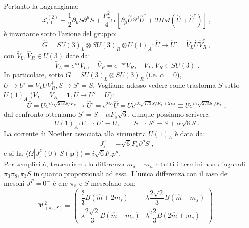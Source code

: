 \documentclass[12pt,a4paper]{article}
\theoremstyle{definition}
\newcommand{\lag}{\mathcal{L}}
\newcommand{\bra}{\langle}
\newcommand{\ket}{\rangle}
\newcommand{\adj}[1]{#1^{\dagger}}
\newcommand{\tr}{\mathrm{tr}}
\numberwithin{equation}{section}
\begin{document}
Pertanto la Lagrangiana:
\begin{equation}
\boxed{
\lag_{\mathrm{eff}}^{(2)}=\frac{1}{2}\partial_{\mu}S\partial^{\mu}S+\frac{F_{\pi}^2}{4}\tr\left[\partial_{\mu}\stackrel{\sim}{U}\partial^{\mu}\adj{\stackrel{\sim}{U}}+2BM(\stackrel{\sim}{U}+\adj{\stackrel{\sim}{U}})\right]
}\;,
\end{equation}
è invariante sotto l'azione del gruppo:
$$
\stackrel{\sim}{G}=SU(3)_L\otimes SU(3)_R\otimes U(1)_A: \stackrel{\sim}{U}\to\stackrel{\sim}{U}'=\stackrel{\sim}{V}_L\stackrel{\sim}{U}\adj{\stackrel{\sim}{V}_R}\;,
$$
con $\stackrel{\sim}{V}_L,\stackrel{\sim}{V}_R\in U(3)$ date da:
\begin{equation}
\stackrel{\sim}{V}_L=e^{i\alpha}V_L,\quad \stackrel{\sim}{V}_R=e^{-i\alpha}V_R,\quad V_L,V_R\in SU(3)\;.
\end{equation}
In particolare, sotto $G=SU(3)_L\otimes SU(3)_R$ (i.e. $\alpha=0$), $U\to U'=V_LU\adj{V}_R, S\to S'=S$. Vogliamo adesso vedere come trasforma $S$ sotto $U(1)_A$ ($V_L=V_R=\mathbf{1}, U\to U'=U$):
$$
\stackrel{\sim}{U}=Ue^{i\lambda\sqrt{2/3}S/F_{\pi}}\to \stackrel{\sim}{U}'=e^{2i\alpha}\stackrel{\sim}{U}=Ue^{i\lambda\sqrt{2/3}S/F_{\pi}+2i\alpha}\equiv Ue^{i\lambda\sqrt{2/3}S'/F_{\pi}}\;,
$$
dal confronto otteniamo $S'=S+\alpha F_s\sqrt{6}$, dunque possiamo scrivere:
\begin{equation}
U(1)_A: U\to U'=U,\qquad S\to S'=S+\alpha\sqrt{6}S\;.
\end{equation}
La corrente di Noether associata alla simmetria $U(1)_A$ è data da:
\begin{equation}
J^{\mu}_5=-\sqrt{6}F_s\partial^{\mu}S\;,
\end{equation}
e si ha $\bra\Omega|J^{\mu}_5(0)|S(\mathbf{p})\ket=i\sqrt{6}F_sp^{\mu}$. \\
Per semplicità, trascuriamo la differenza $m_d-m_u$ e tutti i termini non diagonali $\pi_3\pi_8,\pi_3S$ in quanto proporzionali ad essa. L'unica differenza con il caso dei mesoni $J^P=0^-$ è che $\pi_8$ e $S$ mescolano con:
\begin{equation}
\mathcal{M}^2_{(\pi_8,S)}=\left(\begin{matrix}
\dfrac{2}{3}B(\hat{m}+2m_s) & \lambda\dfrac{2\sqrt{2}}{3}B(\hat{m}-m_s) \\
\lambda \dfrac{2\sqrt{2}}{3}B(\hat{m}-m_s) & \lambda^2\dfrac{2}{3}B(2\hat{m}+m_s)
\end{matrix}\right)\;.
\end{equation}
\end{document}
